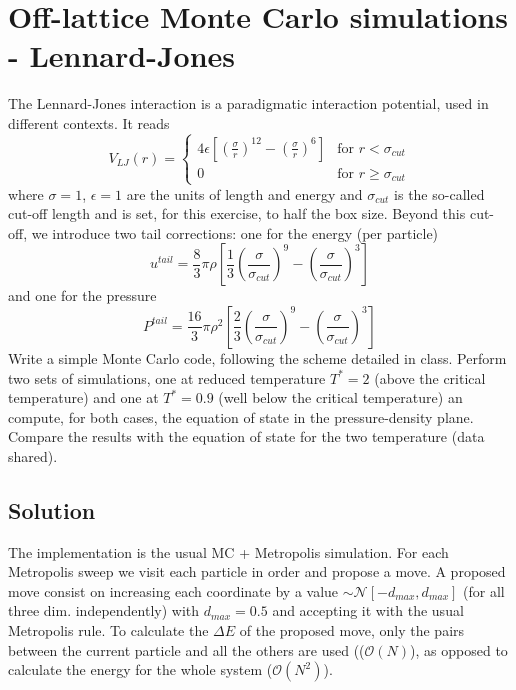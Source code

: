 \documentclass[../main.tex]{subfiles}
\begin{document}
\newpage

\section{Off-lattice Monte Carlo simulations - Lennard-Jones}
The Lennard-Jones interaction is a paradigmatic interaction potential, used in different contexts. It reads
\begin{equation}
V_{LJ}(r) =
\begin{cases}
4\epsilon \left[ \left( \frac{\sigma}{r} \right)^{12} - \left( \frac{\sigma}{r} \right)^{6} \right] & \text{for } r < \sigma_{cut} \\
0 & \text{for } r \geq \sigma_{cut}
\end{cases}
\end{equation}
where $\sigma=1$, $\epsilon=1$ are the units of length and energy and $\sigma_{cut}$ is the so-called cut-off length and is set, for this exercise, to half the box size. Beyond this cut-off, we introduce two tail corrections: one for the energy (per particle)
\begin{equation}
u^{tail} = \frac{8}{3} \pi \rho \left[ \frac{1}{3} \left( \frac{\sigma}{\sigma_{cut}} \right)^{9} - \left( \frac{\sigma}{\sigma_{cut}} \right)^{3} \right]
\end{equation}
and one for the pressure
\begin{equation}
P^{tail} = \frac{16}{3} \pi \rho^2 \left[ \frac{2}{3} \left( \frac{\sigma}{\sigma_{cut}} \right)^{9} - \left( \frac{\sigma}{\sigma_{cut}} \right)^{3} \right]
\end{equation}
Write a simple Monte Carlo code, following the scheme detailed in class. Perform two sets of simulations, one at reduced temperature $T^*=2$ (above the critical temperature) and one at $T^*=0.9$ (well below the critical temperature) an compute, for both cases, the equation of state in the pressure-density plane. Compare the results with the equation of state for the two temperature (data shared).

\subsection{Solution}

The implementation is the usual MC + Metropolis simulation. For each Metropolis sweep we visit each particle in order and propose a move. A proposed move consist on increasing each coordinate by a value $\sim\mathcal{N}[-d_{max}, d_{max}]$ (for all three dim. independently) with $d_{max} = 0.5$ and accepting it with the usual Metropolis rule. To calculate the $\Delta E$ of the proposed move, only the pairs between the current particle and all the others are used (($\mathcal{O}(N)$), as opposed to calculate the energy for the whole system ($\mathcal{O}(N^2)$). 
\end{document}

